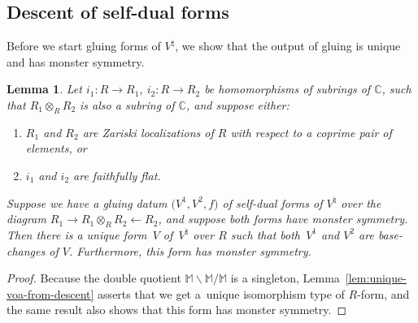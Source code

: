 \documentclass[pdftex]{sigma}
\newcommand{\bC}{\mathbb{C}}
\newcommand{\bM}{\mathbb{M}}
\newtheorem{lem}[thm]{Lemma}
\theoremstyle{definition}
\begin{document}
\subsection{Descent of self-dual forms}

Before we start gluing forms of $V^\natural$, we show that the output of gluing is unique and has monster symmetry.

\begin{lem} \label{lem:unique-R-forms-of-moonshine-from-gluing-data}Let $i_1\colon R \to R_1$, $i_2\colon R \to R_2$ be homomorphisms of subrings of $\bC$, such that $R_1 \otimes_{R} R_2$ is also a subring of $\bC$, and suppose either:
\begin{enumerate}\itemsep=0pt
\item[$1)$] $R_1$ and $R_2$ are Zariski localizations of $R$ with respect to a coprime pair of elements, or
\item[$2)$] $i_1$ and $i_2$ are faithfully flat.
\end{enumerate}
Suppose we have a gluing datum $\big(V^1, V^2, f\big)$ of self-dual forms of $V^\natural$ over the diagram $R_1 \to R_1 \otimes_{R} R_2 \leftarrow R_2$, and suppose both forms have monster symmetry. Then there is a unique form~$V$ of~$V^\natural$ over $R$ such that both~$V^1$ and $V^2$ are base-changes of $V$. Furthermore, this form has monster symmetry.
\end{lem}
\begin{proof}Because the double quotient $\bM \backslash \bM / \bM$ is a singleton, Lemma~\ref{lem:unique-voa-from-descent} asserts that we get a~unique isomorphism type of $R$-form, and the same result also shows that this form has monster symmetry.
\end{proof}
\end{document}
